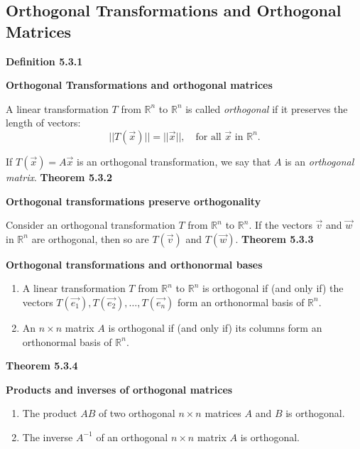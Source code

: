 \subsection{Orthogonal Transformations and Orthogonal Matrices}
\textbf{Definition 5.3.1}\\
\par\noindent\textbf{Orthogonal Transformations and orthogonal matrices}
\par\noindent A linear transformation $T$ from $\mathbb{R}^{n}$ to $\mathbb{R}^{n}$ is called \textit{orthogonal} if it preserves the length of vectors:
\[||T(\vec{x})||=||\vec{x}||,\quad{}\textrm{for all }\vec{x}\textrm{ in }\mathbb{R}^{n}.\]
\par\noindent If $T(\vec{x})=A\vec{x}$ is an orthogonal transformation, we say that $A$ is an \textit{orthogonal matrix}.
\textbf{Theorem 5.3.2}\\
\par\noindent\textbf{Orthogonal transformations preserve orthogonality}
\par\noindent Consider an orthogonal transformation $T$ from $\mathbb{R}^{n}$ to $\mathbb{R}^{n}$. If the vectors $\vec{v}$ and $\vec{w}$ in $\mathbb{R}^{n}$ are orthogonal, then so are $T(\vec{v})$ and $T(\vec{w})$.
\textbf{Theorem 5.3.3}\\
\par\noindent\textbf{Orthogonal transformations and orthonormal bases}
\renewcommand{\labelenumi}{\textbf{\alph{enumi}.}}
\begin{enumerate}
\item A linear transformation $T$ from $\mathbb{R}^{n}$ to $\mathbb{R}^{n}$ is orthogonal if (and only if) the vectors $T(\vec{e_{1}}),T(\vec{e_{2}}),\ldots{},T(\vec{e_{n}})$ form an orthonormal basis of $\mathbb{R}^{n}$.
\item An $n\times{}n$ matrix $A$ is orthogonal if (and only if) its columns form an orthonormal basis of $\mathbb{R}^{n}$.
\end{enumerate}
\textbf{Theorem 5.3.4}\\
\par\noindent\textbf{Products and inverses of orthogonal matrices}
\renewcommand{\labelenumi}{\textbf{\alph{enumi}.}}
\begin{enumerate}
\item The product $AB$ of two orthogonal $n\times{}n$ matrices $A$ and $B$ is orthogonal.
\item The inverse $A^{-1}$ of an orthogonal $n\times{}n$ matrix $A$ is orthogonal.
\end{enumerate}
